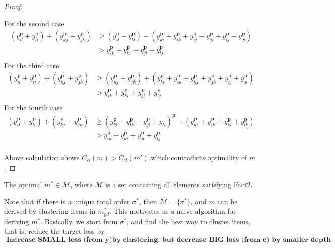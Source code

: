 \begin{proof}
\begin{itemize}
For the second case
\begin{equation*}
\begin{split}
(y_{il}^\mathbf{p}+y_{li}^\mathbf{p})+(y_{kj}^\mathbf{p}+y_{jk}^\mathbf{p})&\geq (y_{il}^\mathbf{p}+y_{li}^\mathbf{p}) + (y_{ki}^\mathbf{p}+y_{ik}^\mathbf{p}+y_{ij}^\mathbf{p}+y_{ji}^\mathbf{p}+y_{lj}^\mathbf{p}+y_{jl}^\mathbf{p})\\
&>y_{ik}^\mathbf{p}+y_{ki}^\mathbf{p}+y_{jl}^\mathbf{p}+y_{lj}^\mathbf{p}\\
\end{split}
\end{equation*}
For the third case
\begin{equation*}
\begin{split}
(y_{il}^\mathbf{p}+y_{li}^\mathbf{p})+(y_{kj}^\mathbf{p}+y_{jk}^\mathbf{p})&\geq(y_{kj}^\mathbf{p}+y_{jk}^\mathbf{p}) + (y_{ki}^\mathbf{p}+y_{ik}^\mathbf{p}+y_{kj}^\mathbf{p}+y_{jk}^\mathbf{p}+y_{lj}^\mathbf{p}+y_{jl}^\mathbf{p})\\
&>y_{ik}^\mathbf{p}+y_{ki}^\mathbf{p}+y_{jl}^\mathbf{p}+y_{lj}^\mathbf{p}\\
\end{split}
\end{equation*}
For the fourth case
\begin{equation*}
\begin{split}
(y_{il}^\mathbf{p}+y_{li}^\mathbf{p})+(y_{kj}^\mathbf{p}+y_{jk}^\mathbf{p})&\geq (y_{kl}^\mathbf{p}+y_{lk}^\mathbf{p}+y_{jl}^\mathbf{p}+y_{li})^\mathbf{p} + (y_{ki}^\mathbf{p}+y_{ik}^\mathbf{p}+y_{kl}^\mathbf{p}+y_{lk}^\mathbf{p})\\
&>y_{ik}^\mathbf{p}+y_{ki}^\mathbf{p}+y_{jl}^\mathbf{p}+y_{lj}^\mathbf{p}\\
\end{split}
\end{equation*}
	\end{itemize}
Above calculation shows $C_{cl}(m)>C_{cl}(m')$ which contradicts optimality of $m$.
	
\end{proof}





\begin{lemma}
	The optimal $m^*\in\mathcal{M}$, where  $\mathcal{M}$ is a set containing all elements satisfying Fact2.
\end{lemma}
\iffalse
Note that if there is a \underline{unique} total order $\sigma^*$, then $\mathcal{M}=\{\sigma^*\}$, and $m$ can be derived by clustering items in $m^*_{pd}$. This motivates us a naive algorithm for deriving $m^*$. Basically, we start from $\sigma^*$, and find the best way to cluster items, that is, reduce the target loss by 
$$\textbf{ Increase SMALL loss (from $\mathbf{y}$)by clustering, but decrease BIG loss (from $\mathbf{c}$) by smaller depth }$$

